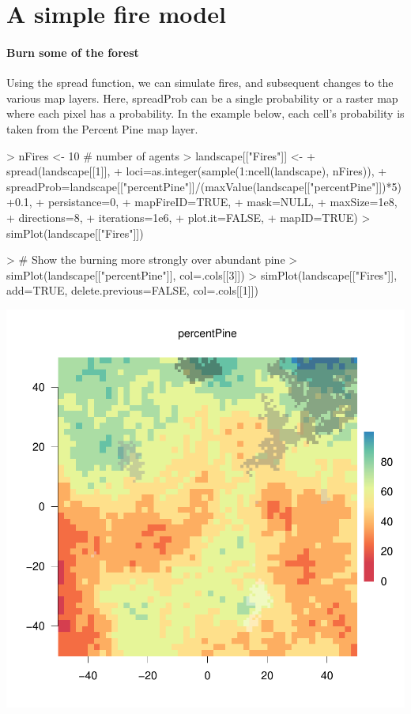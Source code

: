 \documentclass{article}
\begin{document}
\section{A simple fire model}
\paragraph{Burn some of the forest}
Using the spread function, we can simulate fires, and subsequent changes to the various map layers. Here, spreadProb can be a single probability or a raster map where each pixel has a probability. In the example below, each cell's probability is taken from the Percent Pine map layer.

\begin{Schunk}
\begin{Sinput}
> nFires <- 10 # number of agents
> landscape[["Fires"]] <-
+   spread(landscape[[1]],
+          loci=as.integer(sample(1:ncell(landscape), nFires)),
+          spreadProb=landscape[["percentPine"]]/(maxValue(landscape[["percentPine"]])*5)+0.1,
+          persistance=0,
+          mapFireID=TRUE,
+          mask=NULL,
+          maxSize=1e8,
+          directions=8,
+          iterations=1e6,
+          plot.it=FALSE,
+          mapID=TRUE)
> simPlot(landscape[["Fires"]])
\end{Sinput}
\end{Schunk}


\begin{Schunk}
\begin{Sinput}
> # Show the burning more strongly over abundant pine
> simPlot(landscape[["percentPine"]], col=.cols[[3]])
> simPlot(landscape[["Fires"]], add=TRUE, delete.previous=FALSE, col=.cols[[1]])
\end{Sinput}
\end{Schunk}
\includegraphics{introduction-fire-overlaid}
\end{document}
